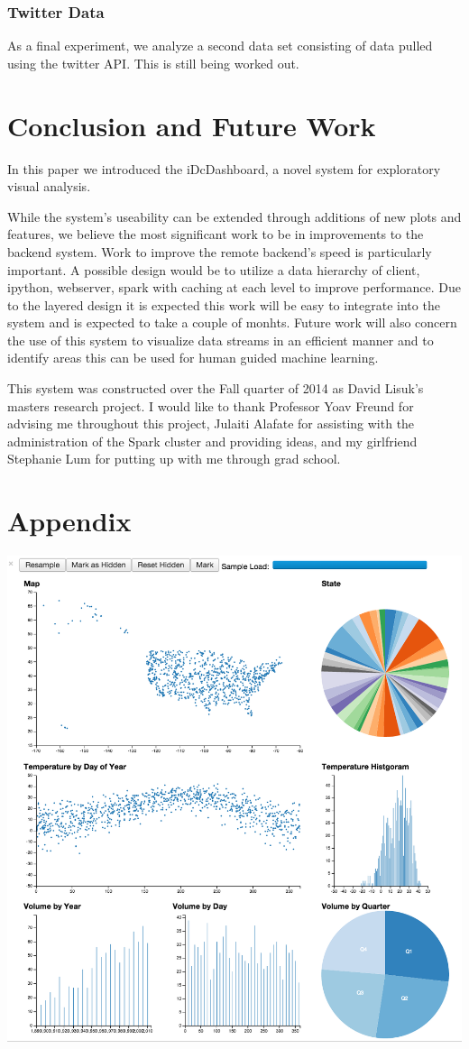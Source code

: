 \documentclass[letter,twocolumn]{article}
\begin{document}
\subsubsection{Twitter Data}

As a final experiment, we analyze a second data set consisting of data pulled using the twitter API.
This is still being worked out.

\section{Conclusion and Future Work}\label{sec:conclusion}%

In this paper we introduced the iDcDashboard, a novel system for exploratory visual analysis.


While the system's useability can be extended through additions of new plots and features, we believe the most significant work to be in improvements to the backend system.
Work to improve the remote backend's speed is particularly important.
A possible design would be to utilize a data hierarchy of client, ipython, webserver, spark with caching at each level to improve performance.
Due to the layered design it is expected this work will be easy to integrate into the system and is expected to take a couple of monhts.
Future work will also concern the use of this system to visualize data streams in an efficient manner and to identify areas this can be used for human guided machine learning.

This system was constructed over the Fall quarter of 2014 as David Lisuk's masters research project.
I would like to thank Professor Yoav Freund for advising me throughout this project, Julaiti Alafate for assisting with the administration of the Spark cluster and providing ideas, and my girlfriend Stephanie Lum for putting up with me through grad school.


\onecolumn

\section{Appendix}
\centering
\includegraphics[width=6in]{figs/weather_dashboard.png}
\label{fig:weather}
\end{document}
